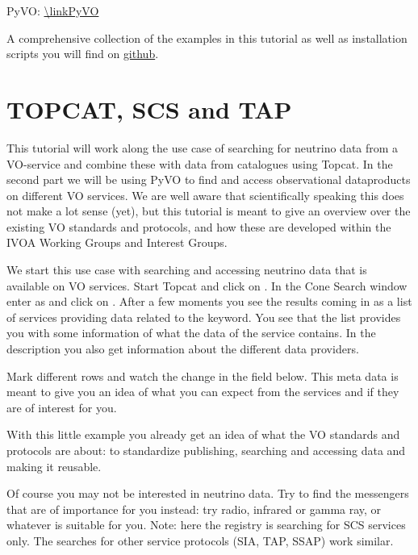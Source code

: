 \documentclass[twoside]{article}[12pt]
\begin{document}
PyVO: \url{\linkPyVO}


A comprehensive collection of the examples in this tutorial as well as
installation scripts you will find on
\href{https://github.com/hendhd/ivoa_newcomers/tree/main/2021_northern_spring}{github}. 

\section {TOPCAT, SCS and TAP}
This tutorial will work along the use case of searching for neutrino
data from a VO-service and combine these with data from catalogues using
Topcat. In the second part we will be using PyVO to find and access
observational dataproducts on different VO services.
We are well aware that scientifically speaking this does not make a lot
sense (yet), but this tutorial is meant to give an overview over the
existing VO standards and protocols, and how these are developed within
the IVOA Working Groups and Interest Groups. 



We start this use case with searching and accessing neutrino data
that is available on VO services. Start Topcat and click on
\goto {}. In the Cone Search window enter
 as  and click on .
After a few moments you see the results coming in as a list of services
providing data related to the keyword. You see that the list provides
you with some information of what the data of the service contains. In
the description you also get information about the different data
providers.

\REGISTRYSTD

Mark different rows and watch the  change in the field below. This meta data is meant to give you an idea of what you can expect from the services and if they are of
interest for you.

With this little example you already get an idea of what the VO
standards and protocols are about: to standardize publishing, searching and
accessing data and making it reusable. 


\begin{exercise}Of course you may not be interested in neutrino data.
Try to find the messengers that are of importance for you instead: try radio,
infrared or gamma ray, or whatever is suitable for you. Note: here the
registry is searching for SCS services only. The searches for other
service protocols (SIA, TAP, SSAP) work similar. 
\end{exercise}
\end{document}
